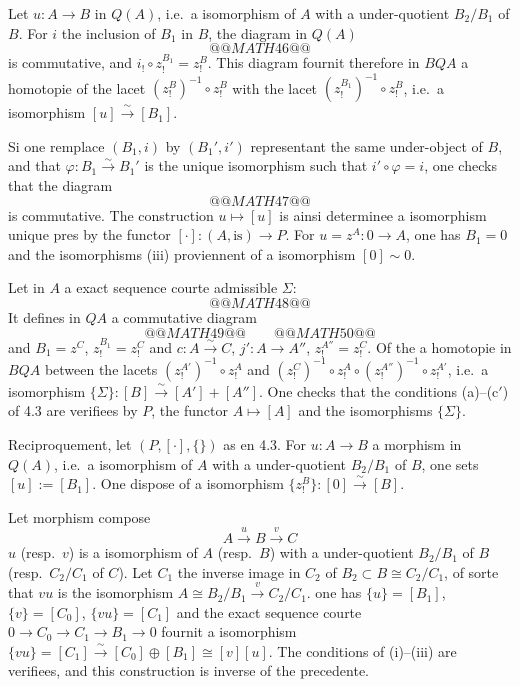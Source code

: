 \documentclass[12pt,a4paper]{article}
\theoremstyle{plain}
\theoremstyle{definition}
\begin{document}
Let $u: A \to B$ in $Q(A)$, i.e.\ a isomorphism of $A$ with a under-quotient
$B_2/B_1$ of $B$. For $i$ the inclusion of $B_1$ in $B$, the diagram in $Q(A)$
\[
@@MATH46@@
\]
is commutative, and $i_! \circ z_!^{B_1} = z_!^B$. This diagram fournit therefore in $BQA$ a homotopie
of the lacet $(z_!^B)^{-1} \circ z_!^B$ with the lacet $(z_!^{B_1})^{-1} \circ z_!^B$, i.e.\ a isomorphism $[u] \xrightarrow{\sim} [B_1]$.

Si one remplace $(B_1, i)$ by $(B_1', i')$ representant the same under-object of $B$,
and that $\varphi: B_1 \xrightarrow{\sim} B_1'$ is the unique isomorphism such that $i' \circ \varphi = i$, one checks that
the diagram
\[
@@MATH47@@
\]
is commutative. The construction $u \mapsto [u]$ is ainsi determinee a isomorphism
unique pres by the functor $[\cdot]: (A, \text{is}) \to P$. For $u = z^A: 0 \to A$, one has
$B_1 = 0$ and the isomorphisms (iii) proviennent of a isomorphism $[0] \sim 0$.

\medskip

Let in $A$ a exact sequence courte admissible $\Sigma$:
\[
@@MATH48@@
\]
It defines in $QA$ a commutative diagram
\[
@@MATH49@@
\qquad
@@MATH50@@
\]
and $B_1 = z^C$, $z_!^{B_1} = z_!^C$ and $c: A \xrightarrow{\sim} C$, $j': A \to A''$, $z_!^{A''} = z_!^C$. Of the a homotopie in $BQA$ between the lacets
$(z_!^{A'})^{-1} \circ z_!^A$ and $(z_!^C)^{-1} \circ z_!^A \circ (z_!^{A''})^{-1} \circ z_!^{A'}$, i.e.\ a isomorphism $\{\Sigma\}: [B] \xrightarrow{\sim} [A'] + [A'']$.
One checks that the conditions (a)--(c$'$) of 4.3 are verifiees by $P$, the functor
$A \mapsto [A]$ and the isomorphisms $\{\Sigma\}$.

Reciproquement, let $(P, [\cdot], \{\})$ as en 4.3. For $u: A \to B$ a
morphism in $Q(A)$, i.e.\ a isomorphism of $A$ with a under-quotient $B_2/B_1$
of $B$, one sets $[u] := [B_1]$. One dispose of a isomorphism $\{z_!^B\}: [0] \xrightarrow{\sim} [B]$.

\medskip

Let morphism compose
\[
A \xrightarrow{u} B \xrightarrow{v} C
\]
$u$ (resp.\ $v$) is a isomorphism of $A$ (resp.\ $B$) with a under-quotient $B_2/B_1$
of $B$ (resp.\ $C_2/C_1$ of $C$). Let $C_1$ the inverse image in $C_2$ of $B_2 \subset
B \cong C_2/C_1$, of sorte that $vu$ is the isomorphism $A \cong B_2/B_1 \xrightarrow{v} C_2/C_1$. one has $\{u\} =
[B_1]$, $\{v\} = [C_0]$, $\{vu\} = [C_1]$ and the exact sequence courte $0 \to C_0 \to C_1 \to B_1 \to 0$
fournit a isomorphism $\{vu\} = [C_1] \xrightarrow{\sim} [C_0] \oplus [B_1] \cong [v][u]$. The conditions of
(i)--(iii) are verifiees, and this construction is inverse of the precedente.
\end{document}
